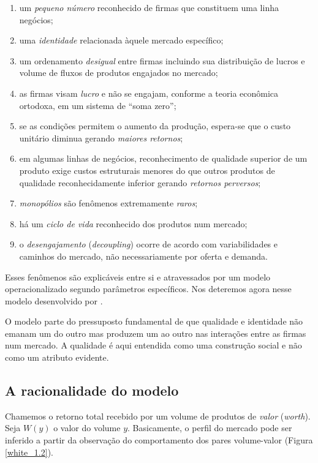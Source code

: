 \documentclass[a4paper, 12pt, openright, oneside, german, french, english, brazil]{abntex2}
\begin{document}
	\begin{enumerate}
		\item um \textit{pequeno número} reconhecido de firmas que constituem uma linha negócios;
		\item uma \textit{identidade} relacionada àquele mercado específico;
		\item um ordenamento \textit{desigual} entre firmas incluindo sua distribuição de lucros e volume de fluxos de produtos engajados no mercado;
		\item as firmas visam \textit{lucro} e não se engajam, conforme a teoria econômica ortodoxa, em um sistema de ``soma zero'';
		\item se as condições permitem o aumento da produção, espera-se que o custo unitário diminua gerando \textit{maiores retornos};
		\item em algumas linhas de negócios, reconhecimento de qualidade superior de um produto exige custos estruturais menores do que outros produtos de qualidade reconhecidamente inferior gerando \textit{retornos perversos};
		\item \textit{monopólios} são fenômenos extremamente \textit{raros};
		\item há um \textit{ciclo de vida} reconhecido dos produtos num mercado;
		\item o \textit{desengajamento} (\textit{decoupling}) ocorre de acordo com variabilidades e caminhos do mercado, não necessariamente por oferta e demanda.
	\end{enumerate}
	
	Esses fenômenos são explicáveis entre si e atravessados por um modelo operacionalizado segundo parâmetros específicos. Nos deteremos agora nesse modelo desenvolvido por .
	
	O modelo parte do pressuposto fundamental de que qualidade e identidade não emanam um do outro mas produzem um ao outro nas interações entre as firmas num mercado. A qualidade é aqui entendida como uma construção social e não como um atributo evidente.
	
	
	\subsection{A racionalidade do modelo}
	
	Chamemos o retorno total recebido por um volume de produtos de \textit{valor} (\textit{worth}). Seja  $W(y)$ o valor do volume $y$. Basicamente, o perfil do mercado pode ser inferido a partir da observação do comportamento dos pares volume-valor (Figura \ref{white_1.2}). 
	
\end{document}
